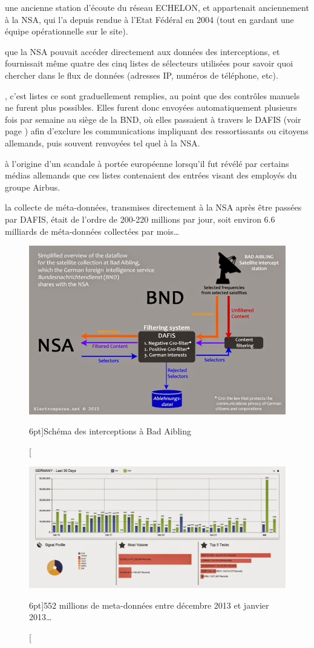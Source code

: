  une ancienne station d'écoute du réseau ECHELON,
et appartenait anciennement à la NSA, qui l'a depuis rendue à l'Etat Fédéral en
2004 (tout en gardant une équipe opérationnelle sur le site).\autocite{spiegel}

 que la NSA pouvait accéder directement aux données
des interceptions, et fournissait même quatre des cinq listes de sélecteurs
utilisées pour savoir quoi chercher dans le flux de données (adresses IP,
numéros de téléphone, etc). 

, c'est listes ce sont graduellement
remplies, au point que des contrôles manuels ne furent plus possibles. Elles
furent donc envoyées automatiquement plusieurs fois par semaine au siège de la
BND, où elles passaient à travers le DAFIS (voir page \pageref{dafis}) afin
d'exclure les communications impliquant des ressortissants ou citoyens
allemands, puis souvent renvoyées tel quel à la NSA.

 à l'origine d'un scandale à portée européenne
lorsqu'il fut révélé par certains médias allemands que ces listes contenaient
des entrées visant des employés du groupe Airbus\autocite{airbus}.

 la collecte de méta-données, transmises directement à la
NSA après être passées par DAFIS, était de l'ordre de 200-220 millions par jour,
soit environ 6.6 milliards de méta-données collectées par mois\ldots\autocite{meta}


\begin{figure}
\includegraphics{ba2.jpg}
\caption[Schéma des interceptions à Bad Aibling][6pt]{Schéma des interceptions à Bad Aibling}
\label{fig:ba2}
\end{figure}


\begin{figure}
\includegraphics{ba3.jpg}
\caption[Capture écran de BOUNDLESSINFORMANT pour l'Allemagne][6pt]{552 millions
de meta-données entre décembre 2013 et janvier 2013\ldots}
\label{fig:ba3}
\end{figure}